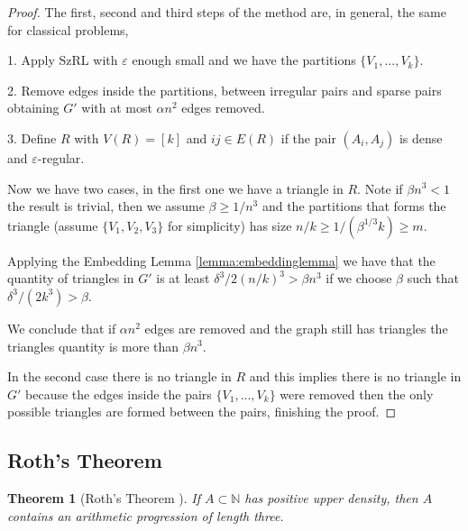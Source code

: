 \documentclass[12pt,twoside,a4paper,bibliography=totocnumbered]{book}
\numberwithin{equation}{section}
\newtheorem{theorem}             {Theorem}[section]
\theoremstyle{remark}
\begin{document}
\begin{proof}
The first, second and third steps of the method are, in general, the same for classical problems,

1. Apply SzRL with $\varepsilon$ enough small and we have the partitions $\{V_1, ... , V_k\}$.

2. Remove edges inside the partitions, between irregular pairs and sparse pairs obtaining $G'$ with at most $\alpha n^2$ edges removed.

3. Define $R$ with $V(R) = [k]$ and $ij \in E(R) $ if  the pair $(A_i, A_j)$ is dense and $\varepsilon$-regular.

Now we have two cases, in the first one we have a triangle in $R$. Note if $\beta n^3 < 1$ the result is trivial, then we assume $\beta \geq 1/n^3$ and the partitions that forms the triangle (assume $\{V_1, V_2, V_3\}$ for simplicity) has size $n/k \geq 1/(\beta ^{1/3} k) \geq m$.

Applying the Embedding Lemma \ref{lemma:embeddinglemma} we have that the quantity of triangles in $G'$ is at least $\delta ^3 /2 (n/k)^3 > \beta n^3$ if we choose $\beta$ such that $\delta ^3 / (2k^3) > \beta$.

We conclude that if $\alpha n^2$ edges are removed and the graph still has triangles the triangles quantity is more than $\beta n^3$.

In the second case there is no triangle in $R$ and this implies there is no triangle in $G'$ because the edges inside the pairs $\{V_1, ... , V_k\}$ were removed then the only possible triangles are formed between the pairs, finishing the proof.
\end{proof}


\subsection{Roth's Theorem}

\begin{theorem}[{Roth's Theorem \cite{Ro53}}] If $A \subset \mathbb{N}$ has positive upper density, then $A$ contains an arithmetic progression of length three. 
\end{theorem}
\end{document}
